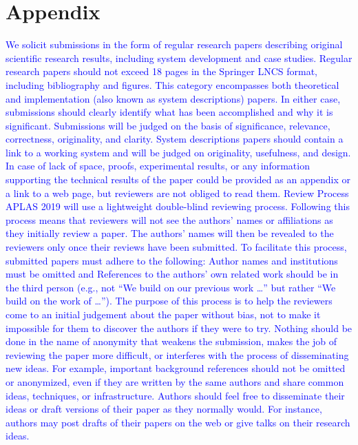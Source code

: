 \documentclass[runningheads]{llncs}
\newcommand{\blue}[1]{\textcolor{blue}{#1 }}
\begin{document}
\section{Appendix}

\blue{We solicit submissions in the form of regular research papers describing original scientific research results, including system development and case studies. Regular research papers should not exceed 18 pages in the Springer LNCS format, including bibliography and figures. This category encompasses both theoretical and implementation (also known as system descriptions) papers. In either case, submissions should clearly identify what has been accomplished and why it is significant. Submissions will be judged on the basis of significance, relevance, correctness, originality, and clarity. System descriptions papers should contain a link to a working system and will be judged on originality, usefulness, and design. In case of lack of space, proofs, experimental results, or any information supporting the technical results of the paper could be provided as an appendix or a link to a web page, but reviewers are not obliged to read them.}
\blue{Review Process
	APLAS 2019 will use a lightweight double-blind reviewing process. Following this process means that reviewers will not see the authors’ names or affiliations as they initially review a paper. The authors’ names will then be revealed to the reviewers only once their reviews have been submitted.
	To facilitate this process, submitted papers must adhere to the following:
	Author names and institutions must be omitted and
	References to the authors’ own related work should be in the third person (e.g., not “We build on our previous work …” but rather “We build on the work of …”).
	The purpose of this process is to help the reviewers come to an initial judgement about the paper without bias, not to make it impossible for them to discover the authors if they were to try. Nothing should be done in the name of anonymity that weakens the submission, makes the job of reviewing the paper more difficult, or interferes with the process of disseminating new ideas. For example, important background references should not be omitted or anonymized, even if they are written by the same authors and share common ideas, techniques, or infrastructure. Authors should feel free to disseminate their ideas or draft versions of their paper as they normally would. For instance, authors may post drafts of their papers on the web or give talks on their research ideas.}
\end{document}
